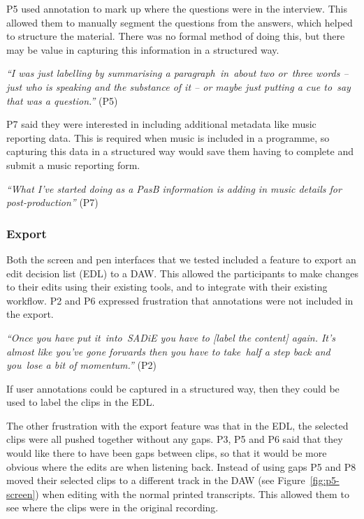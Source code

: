 
P5 used annotation to mark up where the questions were in the interview. This allowed them to manually segment the
questions from the answers, which helped to structure the material. There was no formal method of doing this, but there
may be value in capturing this information in a structured way.

\textit{``I was just labelling by summarising a paragraph in about two or three words -- just who is speaking and the
substance of it -- or maybe just putting a cue to say that was a question.''} (P5) 

P7 said they were interested in including additional metadata like music reporting data. This is required when music is
included in a programme, so capturing this data in a structured way would save them having to complete and submit a
music reporting form.

\textit{``What I've started doing as a PasB information is adding in music details for post-production''} (P7)



\subsubsection{Export}

Both the screen and pen interfaces that we tested included a feature to export an edit decision list (EDL) to a DAW.
This allowed the participants to make changes to their edits using their existing tools, and to integrate with their
existing workflow.  P2 and P6 expressed frustration that annotations were not included in the export.

\textit{``Once you have put it into SADiE you have to [label the content] again. It's almost like you've gone forwards
then you have to take half a step back and you lose a bit of momentum.''} (P2)

If user annotations could be captured in a structured way, then they could be used to label the clips 
in the EDL.

The other frustration with the export feature was that in the EDL, the selected clips were all pushed together without
any gaps. P3, P5 and P6 said that they would like there to have been gaps between clips, so that it would be more
obvious where the edits are when listening back. Instead of using gaps P5 and P8 moved their selected clips to a
different track in the DAW (see Figure~\ref{fig:p5-screen}) when editing with the normal printed transcripts. This
allowed them to see where the clips were in the original recording.

